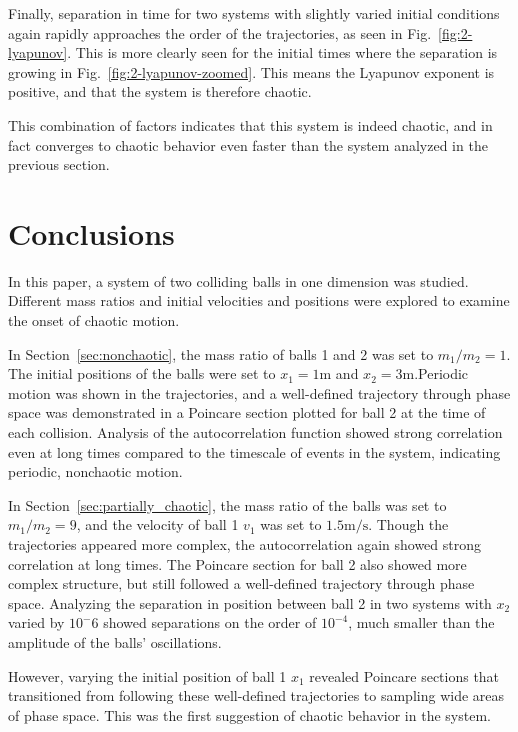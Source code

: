 \documentclass[pra,twocolumn,showpacs,amsmath,amssymb, aps, 10pt]{revtex4-1}
\begin{document}
Finally, separation in time for two systems with slightly varied initial conditions
again rapidly approaches the order of the trajectories, as seen in Fig.~\ref{fig:2-lyapunov}.
This is more clearly seen for the initial times where the separation is growing
in Fig.~\ref{fig:2-lyapunov-zoomed}.
This means the Lyapunov exponent is positive, and that the system is therefore
chaotic.

This combination of factors indicates that this system is indeed chaotic, and in
fact converges to chaotic behavior even faster than the system analyzed in the
previous section.





\section{Conclusions} \label{sec:conclusion}

In this paper, a system of two colliding balls in one dimension was studied.
Different mass ratios and initial velocities and positions were explored to
examine the onset of chaotic motion.

In Section~\ref{sec:nonchaotic}, the mass ratio of balls 1 and 2 was set to
$m_1/m_2=1$. The initial positions of the balls were set to $x_1 = 1\mathrm{m}$
and $x_2=3\mathrm{m}$.Periodic motion was shown in the trajectories, and a well-defined
trajectory through phase space was demonstrated in a Poincare section plotted for
ball 2 at the time of each collision. Analysis of the autocorrelation function
showed strong correlation even at long times compared to the timescale of events
in the system, indicating periodic, nonchaotic motion.

In Section~\ref{sec:partially_chaotic}, the mass ratio of the balls was set to
$m_1/m_2 = 9$, and the velocity of ball 1 $v_1$ was set to $1.5 \mathrm{m/s}$.
Though the trajectories appeared more complex, the autocorrelation again showed
strong correlation at long times. The Poincare section for ball 2 also showed
more complex structure, but still followed a well-defined trajectory through
phase space. Analyzing the separation in position between ball 2 in two systems
with $x_2$ varied by $10^-6$ showed separations on the order of $10^{-4}$, much
smaller than the amplitude of the balls' oscillations.

However, varying the initial position of ball 1 $x_1$ revealed
Poincare sections that transitioned from following these well-defined trajectories
to sampling wide areas of phase space. This was the first suggestion of chaotic
behavior in the system.
\end{document}
